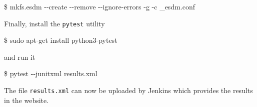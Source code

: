 \begin{framed}
\$ mkfs.esdm {-}{-}create {-}{-}remove {-}{-}ignore-errors -g -c \_esdm.conf
\end{framed}

Finally, install the \texttt{pytest} utility

\begin{framed}
\$ sudo apt-get install python3-pytest
\end{framed}

and run it

\begin{framed}
\$ pytest {-}{-}junitxml results.xml
\end{framed}

The file \texttt{results.xml} can now be uploaded by Jenkins which provides the results in the website.

\begin{comment}

PLEASE, CHECK

\section{Tests in C}

I have nothing else to report here. I don't have access from home.

I created a directory libsrcesdm\_test/Jenkins with the C files and a README with information about the scripts. However, without the output, is pointless.

\end{comment}
